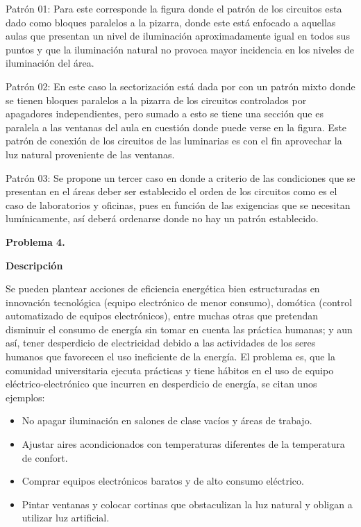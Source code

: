 \documentclass[12pt,letterpaper]{report}
\begin{document}
Patrón 01: Para este corresponde la figura  donde el patrón de los circuitos esta dado como bloques paralelos a la pizarra, donde este está enfocado a aquellas aulas que presentan un nivel de iluminación aproximadamente igual en todos sus puntos y que la iluminación natural no provoca mayor incidencia en los niveles de iluminación del área.

Patrón 02: En este caso la sectorización está dada por con un patrón mixto donde se tienen bloques paralelos a la pizarra de los circuitos controlados por apagadores independientes, pero sumado a esto se tiene una sección que es paralela a las ventanas del aula en cuestión donde puede verse en la figura. Este patrón de conexión de los circuitos de las luminarias es con el fin aprovechar la luz natural proveniente de las ventanas.

Patrón 03: Se propone un tercer caso en donde a criterio de las condiciones que se presentan en el áreas deber ser establecido el orden de los circuitos como es el caso de laboratorios y oficinas, pues en función de las exigencias que se necesitan lumínicamente, así deberá ordenarse donde no hay un patrón establecido.

\textbf{Problema 4.}

\textbf{Descripción }

Se pueden plantear acciones de eficiencia energética bien estructuradas en innovación tecnológica (equipo electrónico de menor consumo), domótica (control automatizado de equipos electrónicos), entre muchas otras que pretendan disminuir el consumo de energía sin tomar en cuenta las práctica humanas; y aun así, tener desperdicio de electricidad debido a las actividades de los seres humanos que favorecen el uso ineficiente de la energía. El problema es, que la comunidad universitaria ejecuta prácticas y tiene hábitos en el uso de equipo eléctrico-electrónico que incurren en desperdicio de energía, se citan unos ejemplos:

\begin{itemize}
\item No apagar iluminación en salones de clase vacíos y áreas de trabajo.
\item Ajustar aires acondicionados con temperaturas diferentes de la temperatura de confort.
\item Comprar equipos electrónicos baratos y de alto consumo eléctrico.
\item Pintar ventanas y colocar cortinas que obstaculizan la luz natural y obligan a utilizar luz artificial.
\end{itemize}
\end{document}
